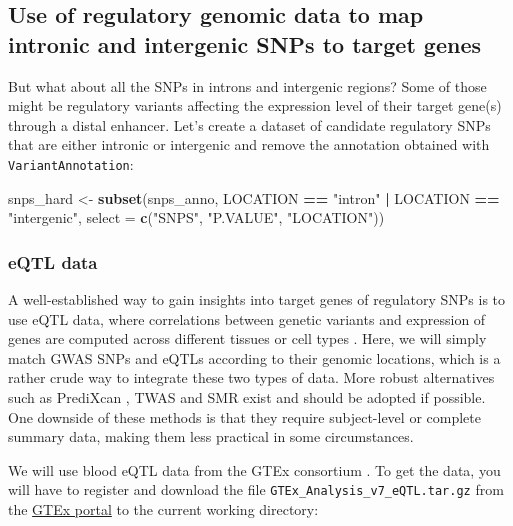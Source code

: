 \documentclass[9pt,a4paper,]{extarticle}
\newenvironment{Shaded}{\begin{snugshade}}{\end{snugshade}}
\newcommand{\KeywordTok}[1]{\textcolor[rgb]{0.13,0.29,0.53}{\textbf{#1}}}
\newcommand{\DataTypeTok}[1]{\textcolor[rgb]{0.13,0.29,0.53}{#1}}
\newcommand{\StringTok}[1]{\textcolor[rgb]{0.31,0.60,0.02}{#1}}
\newcommand{\OperatorTok}[1]{\textcolor[rgb]{0.81,0.36,0.00}{\textbf{#1}}}
\newcommand{\NormalTok}[1]{#1}
\theoremstyle{definition}
\theoremstyle{definition}
\theoremstyle{definition}
\theoremstyle{remark}
\begin{document}
\subsection{Use of regulatory genomic data to map intronic and intergenic SNPs to target genes}\label{use-of-regulatory-genomic-data-to-map-intronic-and-intergenic-snps-to-target-genes}

But what about all the SNPs in introns and intergenic regions?
Some of those might be regulatory variants affecting the expression level of their target gene(s) through a distal enhancer.
Let's create a dataset of candidate regulatory SNPs that are either intronic or intergenic and remove the annotation obtained with \texttt{VariantAnnotation}:

\begin{Shaded}
\begin{Highlighting}[]
\NormalTok{snps_hard <-}\StringTok{ }\KeywordTok{subset}\NormalTok{(snps_anno, LOCATION }\OperatorTok{==}\StringTok{ "intron"} \OperatorTok{|}\StringTok{ }\NormalTok{LOCATION }\OperatorTok{==}\StringTok{ "intergenic"}\NormalTok{, }\DataTypeTok{select =} \KeywordTok{c}\NormalTok{(}\StringTok{"SNPS"}\NormalTok{, }\StringTok{"P.VALUE"}\NormalTok{, }\StringTok{"LOCATION"}\NormalTok{))}
\end{Highlighting}
\end{Shaded}

\subsubsection{eQTL data}\label{eqtl-data}

A well-established way to gain insights into target genes of regulatory SNPs is to use eQTL data, where correlations between genetic variants and expression of genes are computed across different tissues or cell types \citep{Albert2015}.
Here, we will simply match GWAS SNPs and eQTLs according to their genomic locations, which is a rather crude way to integrate these two types of data.
More robust alternatives such as PrediXcan \citep{Gamazon2015}, TWAS \citep{Gusev2016} and SMR \citep{Zhu2016} exist and should be adopted if possible.
One downside of these methods is that they require subject-level or complete summary data, making them less practical in some circumstances.

We will use blood eQTL data from the GTEx consortium \citep{GTEx2017}.
To get the data, you will have to register and download the file \texttt{GTEx\_Analysis\_v7\_eQTL.tar.gz} from the \href{https://www.gtexportal.org}{GTEx portal} to the current working directory:
\end{document}
